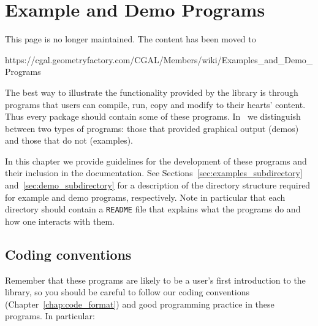 \chapter{Example and Demo Programs\label{chap:examples_and_demos}}

{\HUGE This page is no longer maintained. The content has been moved to

https://cgal.geometryfactory.com/CGAL/Members/wiki/Examples_and_Demo_Programs}

The best way to illustrate the functionality provided by the library
is through programs that users can compile, run, copy and modify to
their hearts' content.  Thus every package should contain some of
these programs.  In \cgal\ we distinguish between two types of
programs:  those that provided graphical output (demos) and those that
do not (examples).

In this chapter we provide guidelines for the development
of these programs and their inclusion in the documentation.  See
Sections~\ref{sec:examples_subdirectory} and~\ref{sec:demo_subdirectory}
for a description of the directory structure required for example and
demo programs, respectively. Note in particular that each directory
should contain a \texttt{README} file that explains what the programs do and
how one interacts with them.

\section{Coding conventions\label{sec:ex_and_demo_coding}}

Remember that these programs are likely to be a user's first introduction
to the library, so you should be careful to follow our coding conventions 
(Chapter~\ref{chap:code_format}) and good programming practice in these 
programs.  In particular:

